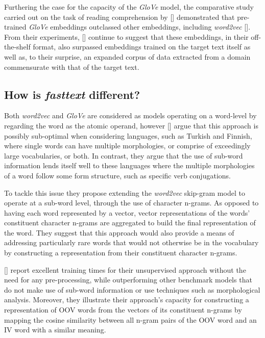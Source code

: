 \documentclass[12pt, a4paper]{report}
\theoremstyle{definition}
\theoremstyle{definition}%
\theoremstyle{definition}%
\theoremstyle{definition}%
\theoremstyle{definition}%
\theoremstyle{definition}%
\renewcommand{\cite}[1]{[\citealp{#1}]}
\begin{document}
Furthering the case for the capacity of the \textit{GloVe} model, the comparative study carried out on the task of reading comprehension by \cite{bhuwandhingra2017} demonstrated that pre-trained \textit{GloVe} embeddings outclassed other embeddings, including \textit{word2vec} \cite{mikolov2013}. From their experiments, \cite{bhuwandhingra2017} continue to suggest that these embeddings, in their off-the-shelf format, also surpassed embeddings trained on the target text itself as well as, to their surprise, an expanded corpus of data extracted from a domain commensurate with that of the target text.

\subsection{How is \textit{fasttext} different?}
Both \textit{word2vec} and \textit{GloVe} are considered as models operating on a word-level by regarding the word as the atomic operand, however \cite{bojanowski2017} argue that this approach is possibly sub-optimal when considering languages, such as Turkish and Finnish, where single words can have multiple morphologies, or comprise of exceedingly large vocabularies, or both. In contrast, they argue that the use of sub-word information lends itself well to these languages where the multiple morphologies of a word follow some form structure, such as specific verb conjugations. 

To tackle this issue they propose extending the \textit{word2vec} skip-gram model to operate at a sub-word level, through the use of character n-grams. As opposed to having each word represented by a vector, vector representations of the words' constituent character n-grams are aggregated to build the final representation of the word. They suggest that this approach would also provide a means of addressing particularly rare words that would not otherwise be in the vocabulary by constructing a representation from their constituent character n-grams. 

\cite{bojanowski2017} report excellent training times for their unsupervised approach without the need for any pre-processing, while outperforming other benchmark models that do not make use of sub-word information or use techniques such as morphological analysis. Moreover, they illustrate their approach's capacity for constructing a representation of OOV words from the vectors of its constituent n-grams by mapping the cosine similarity between all n-gram pairs of the OOV word and an IV word with a similar meaning.
\end{document}
